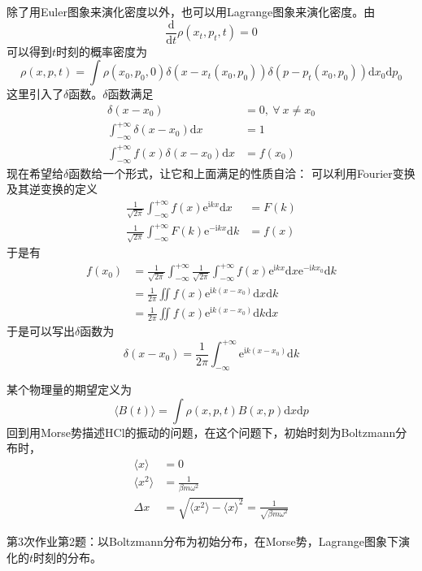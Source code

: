     除了用Euler图象来演化密度以外，也可以用Lagrange图象来演化密度。由
    \begin{equation*}
        \frac {\mathrm{d}}{\mathrm{d}t} \rho(x_t,p_t,t) = 0
    \end{equation*}
    可以得到$t$时刻的概率密度为
    \begin{equation*}
        \rho(x,p,t) = \int \rho(x_0,p_0,0)\delta(x-x_t(x_0,p_0)) \delta(p-p_t(x_0,p_0)) \mathrm{d}x_0\mathrm{d}p_0
    \end{equation*}
    这里引入了$\delta$函数。$\delta$函数满足
    \begin{align*}
        \delta(x-x_0) &= 0, \ \forall \ x \neq x_0\\
        \int_{-\infty}^{+\infty} \delta(x-x_0) \mathrm{d}x &= 1\\
        \int_{-\infty}^{+\infty} f(x)\delta(x-x_0) \mathrm{d}x &= f(x_0)
    \end{align*}
    现在希望给$\delta$函数给一个形式，让它和上面满足的性质自洽：
    可以利用Fourier变换及其逆变换的定义
    \begin{align*}
        \frac 1{\sqrt{2\pi}} \int_{-\infty}^{+\infty} f(x)\mathrm{e}^{\mathrm{i}kx}\mathrm{d}x &= F(k)\\
        \frac 1{\sqrt{2\pi}} \int_{-\infty}^{+\infty} F(k)\mathrm{e}^{-\mathrm{i}kx}\mathrm{d}k &= f(x)
    \end{align*}
    于是有
    \begin{align*}
        f(x_0) &= \frac 1{\sqrt{2\pi}} \int_{-\infty}^{+\infty} \frac 1{\sqrt{2\pi}} \int_{-\infty}^{+\infty} f(x)\mathrm{e}^{\mathrm{i}kx}\mathrm{d}x \mathrm{e}^{-\mathrm{i}kx_0}\mathrm{d}k\\
        &= \frac 1{2\pi} \iint f(x)\mathrm{e}^{\mathrm{i}k(x-x_0)}\mathrm{d}x\mathrm{d}k\\
        &= \frac 1{2\pi} \iint f(x)\mathrm{e}^{\mathrm{i}k(x-x_0)}\mathrm{d}k\mathrm{d}x
    \end{align*}
    于是可以写出$\delta$函数为
    \begin{equation*}
        \delta(x-x_0) = \frac 1{2\pi} \int_{-\infty}^{+\infty} \mathrm{e}^{\mathrm{i}k(x-x_0)}\mathrm{d}k
    \end{equation*}

    某个物理量的期望定义为
    \begin{equation*}
        \langle B(t) \rangle = \int \rho(x,p,t) B(x,p) \mathrm{d}x\mathrm{d}p
    \end{equation*}
    回到用Morse势描述HCl的振动的问题，在这个问题下，初始时刻为Boltzmann分布时，
    \begin{align*}
        \langle x \rangle &= 0\\
        \langle x^2 \rangle &= \frac 1{\beta m \omega^2}\\
        \Delta x &= \sqrt{\langle x^2 \rangle - \langle x \rangle ^2} = \frac 1{\sqrt{\beta m \omega^2}}
    \end{align*}

    \begin{asg}
        第3次作业第2题：以Boltzmann分布为初始分布，在Morse势，Lagrange图象下演化的$t$时刻的分布。
    \end{asg}

    
    